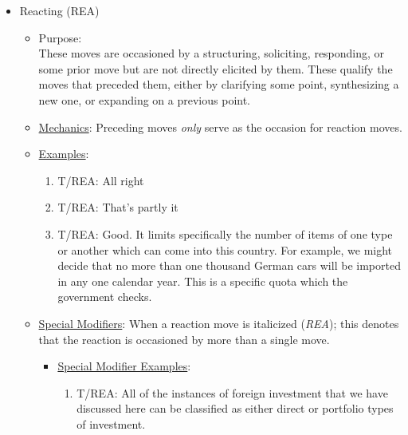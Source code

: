 \documentclass[10pt, letterpaper]{article}
\begin{document}
\begin{itemize}
\item Reacting (REA)
\label{sec:org9e908da}
\begin{itemize}
\item Purpose: \\
These moves are occasioned by a structuring, soliciting, responding, or some prior move but are not directly elicited by them. These qualify the moves that preceded them, either by clarifying some point, synthesizing a new one, or expanding on a previous point.
\item \uline{Mechanics}: Preceding moves \emph{only} serve as the occasion for reaction moves.
\item \uline{Examples}:
\begin{enumerate}
\item T/REA: All right
\item T/REA: That's partly it
\item T/REA: Good. It limits specifically the number of items of one type or another which can come into this country. For example, we might decide that no more than one thousand German cars will be imported in any one calendar year. This is a specific quota which the government checks.
\end{enumerate}
\end{itemize}
\begin{itemize}
\item \uline{Special Modifiers}: When a reaction move is italicized (\emph{REA}); this denotes that the reaction is occasioned by more than a single move.
\begin{itemize}
\item \uline{Special Modifier Examples}:
\begin{enumerate}
\item T/REA: All of the instances of foreign investment that we have discussed here can be classified as either direct or portfolio types of investment.
\end{enumerate}
\end{itemize}
\end{itemize}
\end{itemize}
\end{document}
